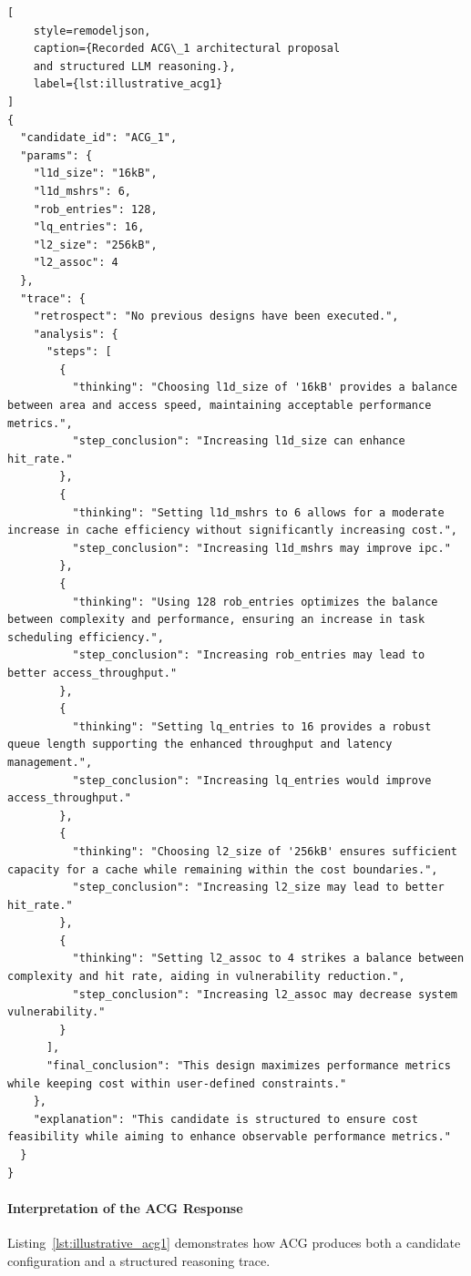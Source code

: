 \begin{lstlisting}[
    style=remodeljson,
    caption={Recorded ACG\_1 architectural proposal
    and structured LLM reasoning.},
    label={lst:illustrative_acg1}
]
{
  "candidate_id": "ACG_1",
  "params": {
    "l1d_size": "16kB",
    "l1d_mshrs": 6,
    "rob_entries": 128,
    "lq_entries": 16,
    "l2_size": "256kB",
    "l2_assoc": 4
  },
  "trace": {
    "retrospect": "No previous designs have been executed.",
    "analysis": {
      "steps": [
        {
          "thinking": "Choosing l1d_size of '16kB' provides a balance between area and access speed, maintaining acceptable performance metrics.",
          "step_conclusion": "Increasing l1d_size can enhance hit_rate."
        },
        {
          "thinking": "Setting l1d_mshrs to 6 allows for a moderate increase in cache efficiency without significantly increasing cost.",
          "step_conclusion": "Increasing l1d_mshrs may improve ipc."
        },
        {
          "thinking": "Using 128 rob_entries optimizes the balance between complexity and performance, ensuring an increase in task scheduling efficiency.",
          "step_conclusion": "Increasing rob_entries may lead to better access_throughput."
        },
        {
          "thinking": "Setting lq_entries to 16 provides a robust queue length supporting the enhanced throughput and latency management.",
          "step_conclusion": "Increasing lq_entries would improve access_throughput."
        },
        {
          "thinking": "Choosing l2_size of '256kB' ensures sufficient capacity for a cache while remaining within the cost boundaries.",
          "step_conclusion": "Increasing l2_size may lead to better hit_rate."
        },
        {
          "thinking": "Setting l2_assoc to 4 strikes a balance between complexity and hit rate, aiding in vulnerability reduction.",
          "step_conclusion": "Increasing l2_assoc may decrease system vulnerability."
        }
      ],
      "final_conclusion": "This design maximizes performance metrics while keeping cost within user-defined constraints."
    },
    "explanation": "This candidate is structured to ensure cost feasibility while aiming to enhance observable performance metrics."
  }
}
\end{lstlisting}

\paragraph{Interpretation of the ACG Response}

Listing~\ref{lst:illustrative_acg1}
demonstrates how ACG produces both a
candidate configuration and a structured
reasoning trace.

